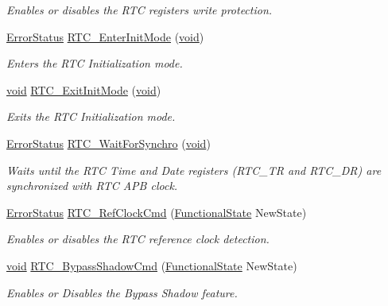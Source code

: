 \begin{DoxyCompactItemize}
\begin{DoxyCompactList}\small\item\em Enables or disables the R\-T\-C registers write protection. \end{DoxyCompactList}\item 
\hyperlink{group___exported__types_ga8333b96c67f83cba354b3407fcbb6ee8}{Error\-Status} \hyperlink{group___r_t_c___group1_ga679f8883cbfb267a53ffb1ab4cc5c8c5}{R\-T\-C\-\_\-\-Enter\-Init\-Mode} (\hyperlink{group___n_a_m_e_ga18028b8badbf1ea7e704ccac3c488e82}{void})
\begin{DoxyCompactList}\small\item\em Enters the R\-T\-C Initialization mode. \end{DoxyCompactList}\item 
\hyperlink{group___n_a_m_e_ga18028b8badbf1ea7e704ccac3c488e82}{void} \hyperlink{group___r_t_c___group1_ga87f86f3b794205f09a1eac51738d900f}{R\-T\-C\-\_\-\-Exit\-Init\-Mode} (\hyperlink{group___n_a_m_e_ga18028b8badbf1ea7e704ccac3c488e82}{void})
\begin{DoxyCompactList}\small\item\em Exits the R\-T\-C Initialization mode. \end{DoxyCompactList}\item 
\hyperlink{group___exported__types_ga8333b96c67f83cba354b3407fcbb6ee8}{Error\-Status} \hyperlink{group___r_t_c___group1_ga2938febeef6baf0d91cc066ca5caf095}{R\-T\-C\-\_\-\-Wait\-For\-Synchro} (\hyperlink{group___n_a_m_e_ga18028b8badbf1ea7e704ccac3c488e82}{void})
\begin{DoxyCompactList}\small\item\em Waits until the R\-T\-C Time and Date registers (R\-T\-C\-\_\-\-T\-R and R\-T\-C\-\_\-\-D\-R) are synchronized with R\-T\-C A\-P\-B clock. \end{DoxyCompactList}\item 
\hyperlink{group___exported__types_ga8333b96c67f83cba354b3407fcbb6ee8}{Error\-Status} \hyperlink{group___r_t_c___group1_gaa60079ec257fb3a277d058ca8305533d}{R\-T\-C\-\_\-\-Ref\-Clock\-Cmd} (\hyperlink{group___exported__types_gac9a7e9a35d2513ec15c3b537aaa4fba1}{Functional\-State} New\-State)
\begin{DoxyCompactList}\small\item\em Enables or disables the R\-T\-C reference clock detection. \end{DoxyCompactList}\item 
\hyperlink{group___n_a_m_e_ga18028b8badbf1ea7e704ccac3c488e82}{void} \hyperlink{group___r_t_c___group1_gae5e7c682f15b8ae9ddd3b2a85a9df7db}{R\-T\-C\-\_\-\-Bypass\-Shadow\-Cmd} (\hyperlink{group___exported__types_gac9a7e9a35d2513ec15c3b537aaa4fba1}{Functional\-State} New\-State)
\begin{DoxyCompactList}\small\item\em Enables or Disables the Bypass Shadow feature. \end{DoxyCompactList}\end{DoxyCompactItemize}


